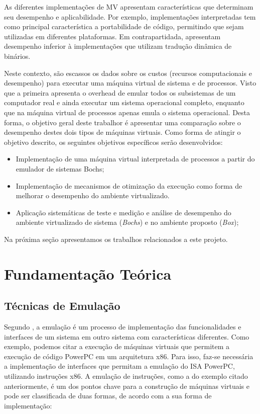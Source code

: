 \documentclass[11pt,twoside]{article}
\begin{document}
As diferentes implementações de MV apresentam características que determinam seu desempenho e aplicabilidade.
Por exemplo, implementações interpretadas tem como principal característica a portabilidade de código, permitindo que sejam utilizadas em diferentes plataformas. 
Em contrapartidada, apresentam desempenho inferior à implementações que utilizam tradução dinâmica de binários.

Neste contexto, são escassos os dados sobre os custos (recursos computacionais e desempenho) para executar uma máquina virtual de sistema e de processos. 
Visto que a primeira apresenta o overhead de emular todos os subsistemas de um computador real e ainda executar um sistema operacional completo, enquanto que na máquina virtual de processos apenas emula o sistema operacional.
Desta forma, o objetivo geral deste trabalhor é apresentar uma comparação sobre o desempenho destes dois tipos de máquinas virtuais.
Como forma de atingir o objetivo descrito, os seguintes objetivos específicos serão desenvolvidos:

\begin{itemize}
 \item Implementação de uma máquina virtual interpretada de processos a partir do emulador de sistemas Bochs;
 \item Implementação de mecanismos de otimização da execução como forma de melhorar o desempenho do ambiente virtualizado.
 \item Aplicação sistemáticas de teste e medição e análise de desempenho do ambiente virtualizado de sistema (\emph{Bochs}) e no ambiente proposto (\emph{Box});
\end{itemize} 

Na próxima seção apresentamos os trabalhos relacionados a este projeto.

\section{Fundamentação Teórica}

 \subsection{Técnicas de Emulação}
Segundo \cite{Smith2005}, a emulação é um processo de implementação das funcionalidades e interfaces de um sistema em outro sistema com características diferentes. 
Como exemplo, podemos citar a execução de máquinas virtuais que permitem a execução de código PowerPC em um arquitetura x86. 
Para isso, faz-se necessária a implementação de interfaces que permitam a emulação do ISA PowerPC, utilizando instruções x86.
A emulação de instruções, como a do exemplo citado anteriormente, é um dos pontos chave para a construção de máquinas virtuais e pode ser classificada de duas formas, de acordo com a sua forma de implementação:
\end{document}
